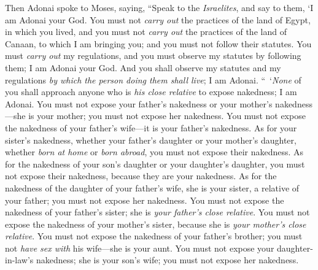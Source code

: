 \begin{biblechapter} %
 Then Adonai spoke to Moses, saying,
\verse “Speak to the \textit{Israelites}, and say to them, ‘I am Adonai your God.
\verse You must not \textit{carry out} the practices of the land of Egypt, in which you lived, and you must not \textit{carry out} the practices of the land of Canaan, to which I am bringing you; and you must not follow their statutes.
\verse You must \textit{carry out} my regulations, and you must observe my statutes by following them; I am Adonai your God.
\verse And you shall observe my statutes and my regulations \textit{by which the person doing them shall live}; I am Adonai.
\verse “ ‘\textit{None} of you shall approach anyone who is \textit{his close relative} to expose nakedness; I am Adonai.
\verse You must not expose your father’s nakedness or your mother’s nakedness—she is your mother; you must not expose her nakedness.
\verse You must not expose the nakedness of your father’s wife—it is your father’s nakedness.
\verse As for your sister’s nakedness, whether your father’s daughter or your mother’s daughter, whether \textit{born at home} or \textit{born abroad}, you must not expose their nakedness.
\verse As for the nakedness of your son’s daughter or your daughter’s daughter, you must not expose their nakedness, because they are your nakedness.
\verse As for the nakedness of the daughter of your father’s wife, she is your sister, a relative of your father; you must not expose her nakedness.
\verse You must not expose the nakedness of your father’s sister; she is \textit{your father’s close relative}.
\verse You must not expose the nakedness of your mother’s sister, because she is \textit{your mother’s close relative}.
\verse You must not expose the nakedness of your father’s brother; you must not \textit{have sex with} his wife—she is your aunt.
\verse You must not expose your daughter-in-law’s nakedness; she is your son’s wife; you must not expose her nakedness.

\end{biblechapter}
